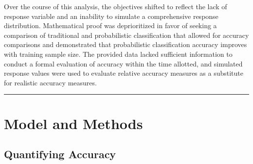 \documentclass[12pt,]{article}
\begin{document}
Over the course of this analysis, the objectives shifted to reflect the
lack of response variable and an inability to simulate a comprehensive
response distribution. Mathematical proof was deprioritized in favor of
seeking a comparison of traditional and probabilistic classification
that allowed for accuracy comparisons and demonstrated that
probabilistic classification accuracy improves with training sample
size. The provided data lacked sufficient information to conduct a
formal evaluation of accuracy within the time allotted, and simulated
response values were used to evaluate relative accuracy measures as a
substitute for realistic accuracy measures.

\begin{center}\rule{0.5\linewidth}{\linethickness}\end{center}

\newpage

\hypertarget{model-and-methods}{%
\section{Model and Methods}\label{model-and-methods}}

\hypertarget{quantifying-accuracy}{%
\subsection{Quantifying Accuracy}\label{quantifying-accuracy}}
\end{document}
